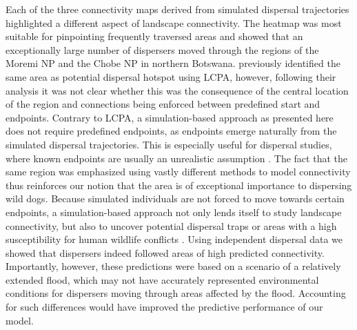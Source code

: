 \documentclass[../FinalThesis.tex]{subfiles}
\begin{document}
Each of the three connectivity maps derived from simulated dispersal
trajectories highlighted a different aspect of landscape connectivity. The
heatmap was most suitable for pinpointing frequently traversed areas and showed
that an exceptionally large number of dispersers moved through the regions of
the Moremi NP and the Chobe NP in northern Botswana. \citet{Hofmann.2021}
previously identified the same area as potential dispersal hotspot using LCPA,
however, following their analysis it was not clear whether this was the
consequence of the central location of the region and connections being enforced
between predefined start and endpoints. Contrary to LCPA, a simulation-based
approach as presented here does not require predefined endpoints, as endpoints
emerge naturally from the simulated dispersal trajectories. This is especially
useful for dispersal studies, where known endpoints are usually an unrealistic
assumption \citep{Elliot.2014, Abrahms.2017, Cozzi.2020}. The fact that the same
region was emphasized using vastly different methods to model connectivity thus
reinforces our notion that the area is of exceptional importance to dispersing
wild dogs. Because simulated individuals are not forced to move towards certain
endpoints, a simulation-based approach not only lends itself to study landscape
connectivity, but also to uncover potential dispersal traps
\citep{VanDerMeer.2014} or areas with a high susceptibility for human wildlife
conflicts \citep{Cushman.2018}. Using independent dispersal data we showed that
dispersers indeed followed areas of high predicted connectivity. Importantly,
however, these predictions were based on a scenario of a relatively extended
flood, which may not have accurately represented environmental conditions for
dispersers moving through areas affected by the flood. Accounting for such
differences would have improved the predictive performance of our model.
\end{document}
